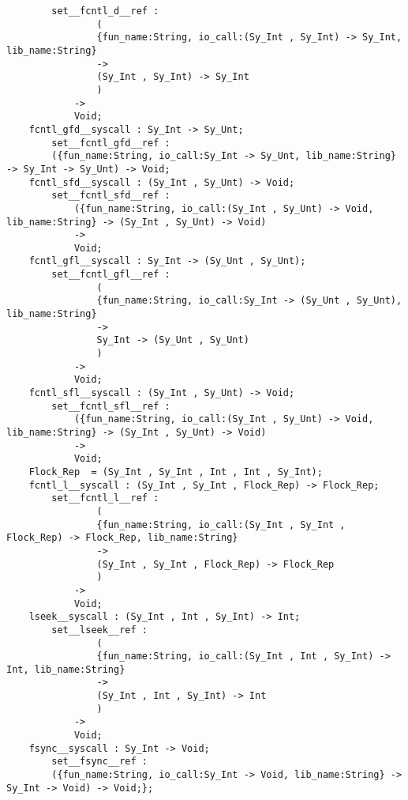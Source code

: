 \begin{verbatim}
        set__fcntl_d__ref :
                (
                {fun_name:String, io_call:(Sy_Int , Sy_Int) -> Sy_Int, lib_name:String}
                ->
                (Sy_Int , Sy_Int) -> Sy_Int
                )
            ->
            Void;
    fcntl_gfd__syscall : Sy_Int -> Sy_Unt;
        set__fcntl_gfd__ref :
        ({fun_name:String, io_call:Sy_Int -> Sy_Unt, lib_name:String} -> Sy_Int -> Sy_Unt) -> Void;
    fcntl_sfd__syscall : (Sy_Int , Sy_Unt) -> Void;
        set__fcntl_sfd__ref :
            ({fun_name:String, io_call:(Sy_Int , Sy_Unt) -> Void, lib_name:String} -> (Sy_Int , Sy_Unt) -> Void)
            ->
            Void;
    fcntl_gfl__syscall : Sy_Int -> (Sy_Unt , Sy_Unt);
        set__fcntl_gfl__ref :
                (
                {fun_name:String, io_call:Sy_Int -> (Sy_Unt , Sy_Unt), lib_name:String}
                ->
                Sy_Int -> (Sy_Unt , Sy_Unt)
                )
            ->
            Void;
    fcntl_sfl__syscall : (Sy_Int , Sy_Unt) -> Void;
        set__fcntl_sfl__ref :
            ({fun_name:String, io_call:(Sy_Int , Sy_Unt) -> Void, lib_name:String} -> (Sy_Int , Sy_Unt) -> Void)
            ->
            Void;
    Flock_Rep  = (Sy_Int , Sy_Int , Int , Int , Sy_Int);
    fcntl_l__syscall : (Sy_Int , Sy_Int , Flock_Rep) -> Flock_Rep;
        set__fcntl_l__ref :
                (
                {fun_name:String, io_call:(Sy_Int , Sy_Int , Flock_Rep) -> Flock_Rep, lib_name:String}
                ->
                (Sy_Int , Sy_Int , Flock_Rep) -> Flock_Rep
                )
            ->
            Void;
    lseek__syscall : (Sy_Int , Int , Sy_Int) -> Int;
        set__lseek__ref :
                (
                {fun_name:String, io_call:(Sy_Int , Int , Sy_Int) -> Int, lib_name:String}
                ->
                (Sy_Int , Int , Sy_Int) -> Int
                )
            ->
            Void;
    fsync__syscall : Sy_Int -> Void;
        set__fsync__ref :
        ({fun_name:String, io_call:Sy_Int -> Void, lib_name:String} -> Sy_Int -> Void) -> Void;};
\end{verbatim}
